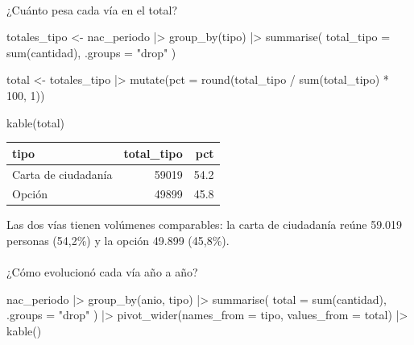 \documentclass[
  letterpaper,
  DIV=11,
  numbers=noendperiod]{scrartcl}
\makeatletter
\let\oldparagraph\paragraph
\renewcommand{\paragraph}{
    \@ifstar
      \xxxParagraphStar
      \xxxParagraphNoStar
  }
\newcommand{\xxxParagraphStar}[1]{\oldparagraph*{#1}\mbox{}}
\newcommand{\xxxParagraphNoStar}[1]{\oldparagraph{#1}\mbox{}}
\newenvironment{Shaded}{\begin{snugshade}}{\end{snugshade}}
\newcommand{\AttributeTok}[1]{\textcolor[rgb]{0.40,0.45,0.13}{#1}}
\newcommand{\DecValTok}[1]{\textcolor[rgb]{0.68,0.00,0.00}{#1}}
\newcommand{\FunctionTok}[1]{\textcolor[rgb]{0.28,0.35,0.67}{#1}}
\newcommand{\NormalTok}[1]{\textcolor[rgb]{0.00,0.23,0.31}{#1}}
\newcommand{\OtherTok}[1]{\textcolor[rgb]{0.00,0.23,0.31}{#1}}
\newcommand{\SpecialCharTok}[1]{\textcolor[rgb]{0.37,0.37,0.37}{#1}}
\newcommand{\StringTok}[1]{\textcolor[rgb]{0.13,0.47,0.30}{#1}}
\makeatother
\begin{document}
\paragraph{¿Cuánto pesa cada vía en el
total?}\label{cuuxe1nto-pesa-cada-vuxeda-en-el-total}

\begin{Shaded}
\begin{Highlighting}[]
\NormalTok{totales\_tipo }\OtherTok{\textless{}{-}}\NormalTok{ nac\_periodo }\SpecialCharTok{|\textgreater{}}
  \FunctionTok{group\_by}\NormalTok{(tipo) }\SpecialCharTok{|\textgreater{}}
  \FunctionTok{summarise}\NormalTok{(}
    \AttributeTok{total\_tipo =} \FunctionTok{sum}\NormalTok{(cantidad),}
    \AttributeTok{.groups =} \StringTok{"drop"}
\NormalTok{  )}

\NormalTok{total }\OtherTok{\textless{}{-}}\NormalTok{ totales\_tipo }\SpecialCharTok{|\textgreater{}}
  \FunctionTok{mutate}\NormalTok{(}\AttributeTok{pct =} \FunctionTok{round}\NormalTok{(total\_tipo }\SpecialCharTok{/} \FunctionTok{sum}\NormalTok{(total\_tipo) }\SpecialCharTok{*} \DecValTok{100}\NormalTok{, }\DecValTok{1}\NormalTok{))}

\FunctionTok{kable}\NormalTok{(total)}
\end{Highlighting}
\end{Shaded}

\begin{longtable}[]{@{}lrr@{}}
\toprule\noalign{}
tipo & total\_tipo & pct \\
\midrule\noalign{}
\endhead
\bottomrule\noalign{}
\endlastfoot
Carta de ciudadanía & 59019 & 54.2 \\
Opción & 49899 & 45.8 \\
\end{longtable}

Las dos vías tienen volúmenes comparables: la carta de ciudadanía reúne
59.019 personas (54,2\%) y la opción 49.899 (45,8\%).

\paragraph{¿Cómo evolucionó cada vía año a
año?}\label{cuxf3mo-evolucionuxf3-cada-vuxeda-auxf1o-a-auxf1o}

\begin{Shaded}
\begin{Highlighting}[]
\NormalTok{nac\_periodo }\SpecialCharTok{|\textgreater{}}
  \FunctionTok{group\_by}\NormalTok{(anio, tipo) }\SpecialCharTok{|\textgreater{}}
  \FunctionTok{summarise}\NormalTok{(}
    \AttributeTok{total =} \FunctionTok{sum}\NormalTok{(cantidad),}
    \AttributeTok{.groups =} \StringTok{"drop"}
\NormalTok{  ) }\SpecialCharTok{|\textgreater{}}
  \FunctionTok{pivot\_wider}\NormalTok{(}\AttributeTok{names\_from =}\NormalTok{ tipo, }\AttributeTok{values\_from =}\NormalTok{ total) }\SpecialCharTok{|\textgreater{}} 
  \FunctionTok{kable}\NormalTok{()}
\end{Highlighting}
\end{Shaded}
\end{document}
